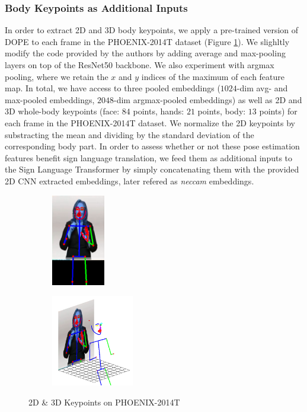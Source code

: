\documentclass[final]{cvpr}
\begin{document}
\subsubsection{Body Keypoints as Additional Inputs}
In order to extract 2D and 3D body keypoints, we apply a pre-trained version of DOPE \cite{dope} to each frame in the PHOENIX-2014T dataset (Figure \ref{fig:2d_3d}). We slighltly modify the code provided by the authors by adding average and max-pooling layers on top of the ResNet50 backbone. We also experiment with argmax pooling, where we retain the $x$ and $y$ indices of the maximum of each feature map. In total, we have access to three pooled embeddings ($1024$-dim avg- and max-pooled embeddings, $2048$-dim argmax-pooled embeddings) as well as 2D and 3D whole-body keypoints (face: $84$ points, hands: $21$ points, body: $13$ points) for each frame in the PHOENIX-2014T dataset. We normalize the 2D keypoints by substracting the mean and dividing by the standard deviation of the corresponding body part. In order to assess whether or not these pose estimation features benefit sign language translation, we feed them as additional inputs to the Sign Language Transformer by simply concatenating them with the provided 2D CNN extracted embeddings, later refered as \textit{neccam} embeddings.

\begin{figure}[h]
	\begin{subfigure}[h]{0.5\linewidth}
		\centering
			\includegraphics[height=4cm]{fig/toy_DOPE_v1_0_0_2d.png}
	\end{subfigure}\hfill
	\begin{subfigure}[]{0.5\linewidth}
		\centering
		\includegraphics[height=4cm]{fig/toy_DOPE_v1_0_0_3d.png}
	\end{subfigure}
	\caption{2D \& 3D Keypoints on PHOENIX-2014T}
	\label{fig:2d_3d}
\end{figure}
\end{document}
